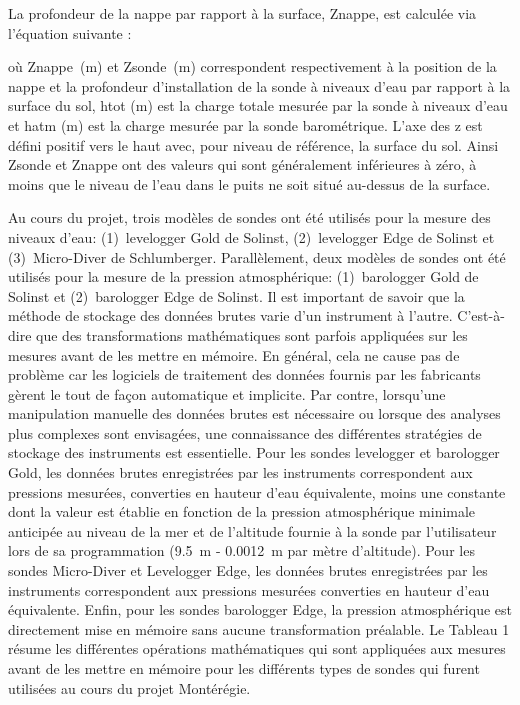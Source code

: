 \documentclass[12pt, letterpaper, fleqn]{report}
\begin{document}
La profondeur de la nappe par rapport à la surface, Znappe, est calculée via l'équation suivante : 

où Znappe (m) et Zsonde (m) correspondent respectivement à la position de la nappe et la profondeur d'installation de la sonde à niveaux d'eau par rapport à la surface du sol, htot (m) est la charge totale mesurée par la sonde à niveaux d'eau et hatm (m) est la charge mesurée par la sonde barométrique. L'axe des z est défini positif vers le haut avec, pour niveau de référence, la surface du sol. Ainsi Zsonde et Znappe ont des valeurs qui sont généralement inférieures à zéro, à moins que le niveau de l'eau dans le puits ne soit situé au-dessus de la surface.

Au cours du projet, trois modèles de sondes ont été utilisés pour la mesure des niveaux d’eau: (1) levelogger Gold de Solinst, (2) levelogger Edge de Solinst et (3) Micro-Diver de Schlumberger. Parallèlement, deux modèles de sondes ont été utilisés pour la mesure de la pression atmosphérique: (1) barologger Gold de Solinst et (2) barologger Edge de Solinst. Il est important de savoir que la méthode de stockage des données brutes varie d'un instrument à l'autre. C’est-à-dire que des transformations mathématiques sont parfois appliquées sur les mesures avant de les mettre en mémoire. En général, cela ne cause pas de problème car les logiciels de traitement des données fournis par les fabricants gèrent le tout de façon automatique et implicite. Par contre, lorsqu'une manipulation manuelle des données brutes est nécessaire ou lorsque des analyses plus complexes sont envisagées, une connaissance des différentes stratégies de stockage des instruments est essentielle.
Pour les sondes levelogger et barologger Gold, les données brutes enregistrées par les instruments correspondent aux pressions mesurées, converties en hauteur d'eau équivalente, moins une constante dont la valeur est établie en fonction de la pression atmosphérique minimale anticipée au niveau de la mer et de l'altitude fournie à la sonde par l'utilisateur lors de sa programmation (9.5 m - 0.0012 m par mètre d'altitude). Pour les sondes Micro-Diver et Levelogger Edge, les données brutes enregistrées par les instruments correspondent aux pressions mesurées converties en hauteur d'eau équivalente. Enfin, pour les sondes barologger Edge, la pression atmosphérique est directement mise en mémoire sans aucune transformation préalable. Le Tableau 1 résume les différentes opérations mathématiques qui sont appliquées aux mesures avant de les mettre en mémoire pour les différents types de sondes qui furent utilisées au cours du projet Montérégie.
\end{document}
